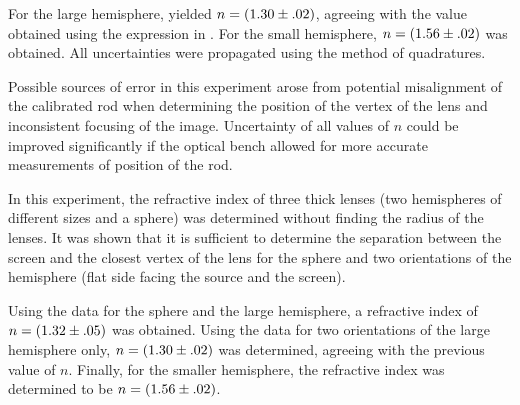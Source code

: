 \begin{paper}
	For the large hemisphere, \eqnHemisphereOnly yielded \( n = \left(1.30 \pm .02\right) \), agreeing with the value obtained using the expression in \eqnValueWithSphere. For the small hemisphere, \( n = \left(1.56 \pm .02\right) \) was obtained. All uncertainties were propagated using the method of quadratures. 
	
	Possible sources of error in this experiment arose from potential misalignment of the calibrated rod when determining the position of the vertex of the lens and inconsistent focusing of the image. Uncertainty of all values of \( n \) could be improved significantly if the optical bench allowed for more accurate measurements of position of the rod.
	

		In this experiment, the refractive index of three thick lenses (two hemispheres of different sizes and a sphere) was determined without finding the radius of the lenses. It was shown that it is sufficient to determine the separation between the screen and the closest vertex of the lens for the sphere and two orientations of the hemisphere (flat side facing the source and the screen). 
		
		Using the data for the sphere and the large hemisphere, a refractive index of \( n = \left(1.32 \pm .05\right) \) was obtained. Using the data for two orientations of the large hemisphere only, \( n = \left(1.30 \pm .02\right) \) was determined, agreeing with the previous value of \( n \). Finally, for the smaller hemisphere, the refractive index was determined to be \( n = \left(1.56 \pm .02\right) \).



\end{paper}

